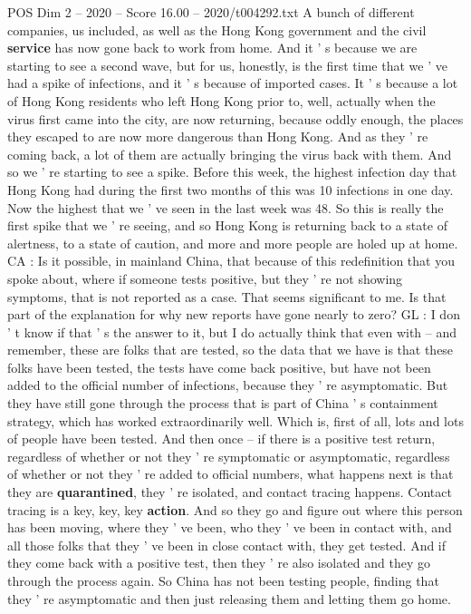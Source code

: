 \begin{textsample}{POS Dim 2 – 2020 – Score 16.00 – 2020/t004292.txt}
A bunch of different companies, us included, as well as the Hong Kong government and the civil \textbf{service} has now gone back to work from home.
And it ' s because we are starting to see a second wave, but for us, honestly, is the first time that we ' ve had a spike of infections, and it ' s because of imported cases.
It ' s because a lot of Hong Kong residents who left Hong Kong prior to, well, actually when the virus first came into the city, are now returning, because oddly enough, the places they escaped to are now more dangerous than Hong Kong.
And as they ' re coming back, a lot of them are actually bringing the virus back with them.
And so we ' re starting to see a spike.
Before this week, the highest infection day that Hong Kong had during the first two months of this was 10 infections in one day.
Now the highest that we ' ve seen in the last week was 48.
So this is really the first spike that we ' re seeing, and so Hong Kong is returning back to a state of alertness, to a state of caution, and more and more people are holed up at home.
CA : Is it possible, in mainland China, that because of this redefinition that you spoke about, where if someone tests positive, but they ' re not showing symptoms, that is not reported as a case.
That seems significant to me.
Is that part of the explanation for why new reports have gone nearly to zero?
GL : I don ' t know if that ' s the answer to it, but I do actually think that even with -- and remember, these are folks that are tested, so the data that we have is that these folks have been tested, the tests have come back positive, but have not been added to the official number of infections, because they ' re asymptomatic.
But they have still gone through the process that is part of China ' s containment strategy, which has worked extraordinarily well.
Which is, first of all, lots and lots of people have been tested.
And then once -- if there is a positive test return, regardless of whether or not they ' re symptomatic or asymptomatic, regardless of whether or not they ' re added to official numbers, what happens next is that they are \textbf{quarantined}, they ' re isolated, and contact tracing happens.
Contact tracing is a key, key, key \textbf{action}.
And so they go and figure out where this person has been moving, where they ' ve been, who they ' ve been in contact with, and all those folks that they ' ve been in close contact with, they get tested.
And if they come back with a positive test, then they ' re also isolated and they go through the process again.
So China has not been testing people, finding that they ' re asymptomatic and then just releasing them and letting them go home.

\end{textsample}
